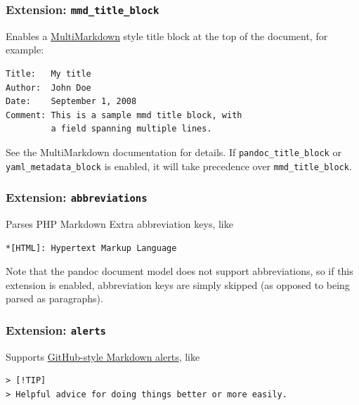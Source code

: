\documentclass[
]{article}
\begin{document}
\hypertarget{extension-mmd_title_block}{%
\subsubsection{\texorpdfstring{Extension:
\texttt{mmd\_title\_block}}{Extension: mmd\_title\_block}}\label{extension-mmd_title_block}}

Enables a
\href{https://fletcherpenney.net/multimarkdown/}{MultiMarkdown} style
title block at the top of the document, for example:

\begin{verbatim}
Title:   My title
Author:  John Doe
Date:    September 1, 2008
Comment: This is a sample mmd title block, with
         a field spanning multiple lines.
\end{verbatim}

See the MultiMarkdown documentation for details. If
\texttt{pandoc\_title\_block} or \texttt{yaml\_metadata\_block} is
enabled, it will take precedence over \texttt{mmd\_title\_block}.

\hypertarget{extension-abbreviations}{%
\subsubsection{\texorpdfstring{Extension:
\texttt{abbreviations}}{Extension: abbreviations}}\label{extension-abbreviations}}

Parses PHP Markdown Extra abbreviation keys, like

\begin{verbatim}
*[HTML]: Hypertext Markup Language
\end{verbatim}

Note that the pandoc document model does not support abbreviations, so
if this extension is enabled, abbreviation keys are simply skipped (as
opposed to being parsed as paragraphs).

\hypertarget{extension-alerts}{%
\subsubsection{\texorpdfstring{Extension:
\texttt{alerts}}{Extension: alerts}}\label{extension-alerts}}

Supports
\href{https://docs.github.com/en/get-started/writing-on-github/getting-started-with-writing-and-formatting-on-github/basic-writing-and-formatting-syntax\#alerts}{GitHub-style
Markdown alerts}, like

\begin{verbatim}
> [!TIP]
> Helpful advice for doing things better or more easily.
\end{verbatim}
\end{document}
